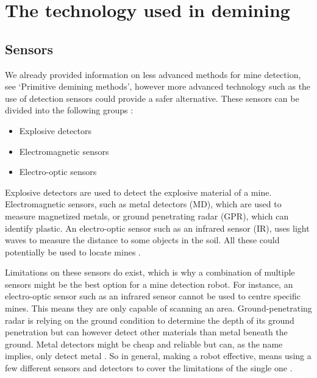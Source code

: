 \chapter{The technology used in demining}

\section{Sensors}

We already provided information on less advanced methods for mine detection, see ‘Primitive demining methods’, however more advanced technology such as the use of detection sensors could provide a safer alternative. These sensors can be divided into the following groups \cite{HumanitarianDemining2017}:
\begin{itemize}
\setlength{\itemsep}{0.05\baselineskip}
	\item Explosive detectors
	\item Electromagnetic sensors
	\item Electro-optic sensors
\end{itemize}

Explosive detectors are used to detect the explosive material of a mine. Electromagnetic sensors, such as metal detectors (MD), which are used to measure magnetized metals, or ground penetrating radar (GPR), which can identify plastic. An electro-optic sensor such as an infrared sensor (IR), uses light waves to measure the distance to some objects in the soil. All these could potentially be used to locate mines \cite{HumanitarianDemining2017}.

Limitations on these sensors do exist, which is why a combination of multiple sensors might be the best option for a mine detection robot. For instance, an electro-optic sensor such as an infrared sensor cannot be used to centre specific mines. This means they are only capable of scanning an area. Ground-penetrating radar is relying on the ground condition to determine the depth of its ground penetration but can however detect other materials than metal beneath the ground. Metal detectors might be cheap and reliable but can, as the name implies, only detect metal \cite{HumanitarianDemining2017}.
So in general, making a robot effective, means using a few different sensors and detectors to cover the limitations of the single one \cite{6LeggedRobot2007}.



